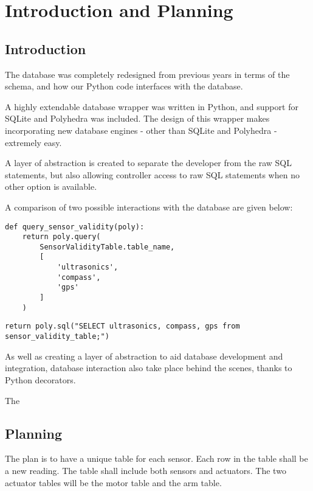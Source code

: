 \section{Introduction and Planning}
\subsection{Introduction}
The database was completely redesigned from previous years in terms of the schema, and how our Python code interfaces with the database.

A highly extendable database wrapper was written in Python, and support for SQLite and Polyhedra was included. The design of this wrapper makes incorporating new database engines - other than SQLite and Polyhedra - extremely easy.

A layer of abstraction is created to separate the developer from the raw SQL statements, but also allowing controller access to raw SQL statements when no other option is available.

A comparison of two possible interactions with the database are given below:

\begin{lstlisting}[style=custompython]
def query_sensor_validity(poly):
    return poly.query(
        SensorValidityTable.table_name,
        [
            'ultrasonics',
            'compass',
            'gps'
        ]
    )
\end{lstlisting}

\begin{lstlisting}[style=custompython]
return poly.sql("SELECT ultrasonics, compass, gps from sensor_validity_table;")
\end{lstlisting}

As well as creating a layer of abstraction to aid database development and integration, database interaction also take place behind the scenes, thanks to Python decorators.

The 

\subsection{Planning}
The plan is to have a unique table for each sensor. Each row in the table shall be a new reading. The table shall include both sensors and actuators. 
\newline
The two actuator tables will be the motor table and the arm table. 


